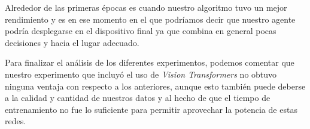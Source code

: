 Alrededor de las primeras épocas es cuando nuestro algoritmo tuvo un mejor rendimiento y es en ese momento en el que podríamos decir que nuestro agente podría desplegarse en el dispositivo final ya que combina en general pocas decisiones y hacia el lugar adecuado.
\medskip

Para finalizar el análisis de los diferentes experimentos, podemos comentar que nuestro experimento que incluyó el uso de \textit{Vision Transformers} no obtuvo ninguna ventaja con respecto a los anteriores, aunque esto también puede deberse a la calidad y cantidad de nuestros datos y al hecho de que el tiempo de entrenamiento no fue lo suficiente para permitir aprovechar la potencia de estas redes.
\medskip


